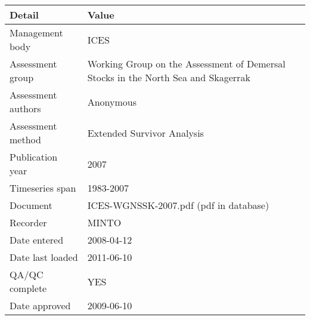 \begin{table}[htb]
\centering
\begin{tabular}{lp{7cm}}
\toprule
Detail & Value \\
\midrule
Management body    & ICES                                                                              \\
Assessment group   & Working Group on the Assessment of Demersal Stocks in the North Sea and Skagerrak \\
Assessment authors & Anonymous                                                                         \\
Assessment method  & Extended Survivor Analysis                                                        \\
Publication year   & 2007                                                                              \\
Timeseries span    & 1983-2007                                                                         \\
Document           & ICES-WGNSSK-2007.pdf (pdf in database)                                            \\
Recorder           & MINTO                                                                             \\
Date entered       & 2008-04-12                                                                        \\
Date last loaded   & 2011-06-10                                                                        \\
QA/QC complete     & YES                                                                               \\
Date approved      & 2009-06-10                                                                        \\
\bottomrule
\end{tabular}
\label{tab:assessdet}
\end{table}

